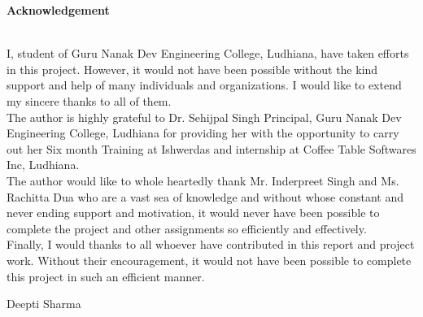 \begin{center}
{\Huge \bf{Acknowledgement}\vskip 0.2in}
\end{center}
 \hrulefill \\

I, student of Guru Nanak Dev Engineering College, Ludhiana, have taken efforts in this project.
However, it would not have been possible without the kind support and help of many individuals
and organizations. I would like to extend my sincere thanks to all of them.\\

The author is highly grateful to Dr. Sehijpal Singh Principal, Guru Nanak Dev Engineering College, Ludhiana for providing her with the opportunity to carry out her Six month Training at Ishwerdas and internship at Coffee Table Softwares Inc, Ludhiana.\\

The author would like to whole heartedly thank Mr. Inderpreet Singh and Ms. Rachitta Dua who are a vast sea of knowledge and without whose constant and never ending support and motivation, it would never have been possible to complete the project and other assignments so efficiently and effectively.\\

Finally, I would thanks to all whoever have contributed in this report and project work. Without their encouragement, it would not have been possible
to complete this project in such an efficient manner.

\vskip 1.0cm 
\noindent Deepti Sharma



